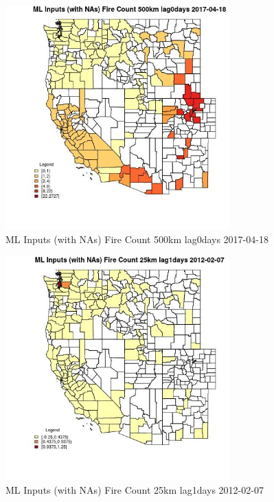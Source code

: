 \begin{figure} 
\centering  
\includegraphics[width=0.77\textwidth]{Code_Outputs/Report_ML_input_PM25_Step4_part_f_de_duplicated_aveswNAs_CountyFire_Count_500km_lag0daysMean2017-04-18.jpg} 
\caption{\label{fig:Report_ML_input_PM25_Step4_part_f_de_duplicated_aveswNAsCountyFire_Count_500km_lag0daysMean2017-04-18}ML Inputs (with NAs) Fire Count 500km lag0days 2017-04-18} 
\end{figure} 
 

\begin{figure} 
\centering  
\includegraphics[width=0.77\textwidth]{Code_Outputs/Report_ML_input_PM25_Step4_part_f_de_duplicated_aveswNAs_CountyFire_Count_25km_lag1daysMean2012-02-07.jpg} 
\caption{\label{fig:Report_ML_input_PM25_Step4_part_f_de_duplicated_aveswNAsCountyFire_Count_25km_lag1daysMean2012-02-07}ML Inputs (with NAs) Fire Count 25km lag1days 2012-02-07} 
\end{figure} 
 

